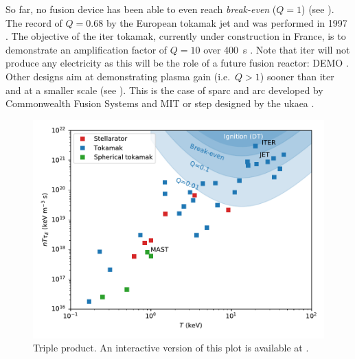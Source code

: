 So far, no fusion device has been able to even reach \textit{break-even} ($Q = 1$) (see ).
The record of $Q = 0.68$ by the European \gls{tokamak} \gls{jet} and was performed in 1997 .
The objective of the \acrshort{iter} \gls{tokamak}, currently under construction in France, is to demonstrate an amplification factor of $Q=10$ over \SI{400}{s} . 
Note that \acrshort{iter} will not produce any electricity as this will be the role of a future fusion reactor: DEMO .
Other designs aim at demonstrating \gls{plasma} gain (i.e.\ $Q > 1$) sooner than \acrshort{iter} and at a smaller scale (see ).
This is the case of \acrshort{sparc} and \acrshort{arc} developed by Commonwealth Fusion Systems and MIT  or \acrshort{step} designed by the \gls{ukaea} .

\begin{figure}
    \centering
    \includegraphics[width=\linewidth]{Figures/Chapter1/triple_product_vs_T.pdf}
    \caption{Triple product. An interactive version of this plot is available at \cite{delaporte-mathurin_remdelaportemathurinfusion-world_2022}.}
\end{figure}

